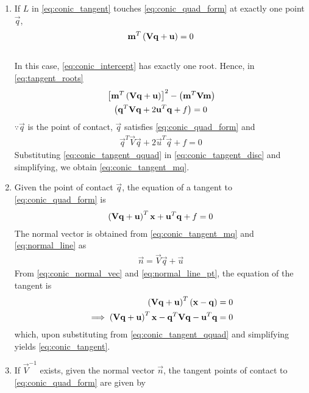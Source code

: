 \documentclass[journal,12pt,twocolumn]{IEEEtran}
\renewcommand\thesection{\arabic{section}}
\renewcommand\thesubsection{\thesection.\arabic{subsection}}
\begin{document}
\begin{enumerate}[label=\thesubsection.\arabic*.,ref=\thesubsection.\theenumi]
\item  If $L$ in \eqref{eq:conic_tangent} touches \eqref{eq:conic_quad_form} at exactly one point $\vec{q}$, 
  \begin{align}
  \mathbf{m}^T\left(\mathbf{V}\mathbf{q}+\mathbf{u}\right) = 0
  \label{eq:conic_tangent_mq}
  \end{align}
\\
\solution
In this case, \eqref{eq:conic_intercept} has exactly one root.  Hence, 
  in \eqref{eq:tangent_roots}
  \begin{multline}
  {}\left[
  \mathbf{m}^T\left(\mathbf{V}\mathbf{q}+\mathbf{u}\right)
  \right]^2 -\left(\mathbf{m}^T\mathbf{V}\mathbf{m}\right)
  \\
  \left(
  \mathbf{q}^T\mathbf{V}\mathbf{q} + 2\mathbf{u}^T\mathbf{q} +f
  \right) = 0                                                                                             
  \label{eq:conic_tangent_disc}
  \end{multline}                    
  $\because \vec{q}$ is the point of contact, $\vec{q}$ satisfies \eqref{eq:conic_quad_form}
  and 
  \begin{align}
  \vec{q}^T\vec{V}\vec{q} + 2\vec{u}^T\vec{q} +f = 0
  \label{eq:conic_tangent_qquad}
  \end{align}
  Substituting \eqref{eq:conic_tangent_qquad} in \eqref{eq:conic_tangent_disc} and simplifying, we obtain \eqref{eq:conic_tangent_mq}.
  \item Given the point of contact $\vec{q}$, the equation of a tangent to \eqref{eq:conic_quad_form} is 
  \begin{align}
  \left(\mathbf{V}\mathbf{q}+\mathbf{u}\right)^T\mathbf{x}+\mathbf{u}^T\mathbf{q}+f = 0
  \label{eq:conic_tangent_final}
  \end{align}
  \solution The normal vector is obtained from \eqref{eq:conic_tangent_mq} 
and \eqref{eq:normal_line}
  as
  \begin{align}
  \label{eq:conic_normal_vec}
  \vec{n} = \vec{V}\vec{q}+\vec{u}
  \end{align}  
  From \eqref{eq:conic_normal_vec} and \eqref{eq:normal_line_pt}, the equation of the tangent is\begin{align}
    \left(\mathbf{V}\mathbf{q}+\mathbf{u}\right)^T\left(\mathbf{x}-\mathbf{q}\right) &=0
    \\
    \implies \left(\mathbf{V}\mathbf{q}+\mathbf{u}\right)^T\mathbf{x}-\mathbf{q}^T\mathbf{V}\mathbf{q}-\mathbf{u}^T\mathbf{q} &= 0
    \end{align}
    which, upon substituting from \eqref{eq:conic_tangent_qquad} and simplifying yields \eqref{eq:conic_tangent}.
    \item   If $\vec{V}^{-1}$ exists, given the normal vector $\vec{n}$, the tangent points of contact to \eqref{eq:conic_quad_form} are given by

\end{enumerate}
\end{document}
